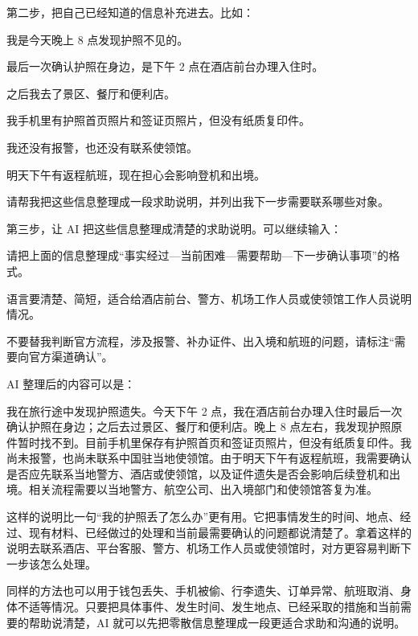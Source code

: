 第二步，把自己已经知道的信息补充进去。比如：

\begin{tcolorbox}[promptbox]
我是今天晚上 8 点发现护照不见的。

最后一次确认护照在身边，是下午 2 点在酒店前台办理入住时。

之后我去了景区、餐厅和便利店。

我手机里有护照首页照片和签证页照片，但没有纸质复印件。

我还没有报警，也还没有联系使领馆。

明天下午有返程航班，现在担心会影响登机和出境。

请帮我把这些信息整理成一段求助说明，并列出我下一步需要联系哪些对象。
\end{tcolorbox}

第三步，让 AI 把这些信息整理成清楚的求助说明。可以继续输入：

\begin{tcolorbox}[promptbox]
请把上面的信息整理成“事实经过—当前困难—需要帮助—下一步确认事项”的格式。

语言要清楚、简短，适合给酒店前台、警方、机场工作人员或使领馆工作人员说明情况。

不要替我判断官方流程，涉及报警、补办证件、出入境和航班的问题，请标注“需要向官方渠道确认”。
\end{tcolorbox}

AI 整理后的内容可以是：

\begin{tcolorbox}[promptbox]
我在旅行途中发现护照遗失。今天下午 2 点，我在酒店前台办理入住时最后一次确认护照在身边；之后去过景区、餐厅和便利店。晚上 8 点左右，我发现护照原件暂时找不到。目前手机里保存有护照首页和签证页照片，但没有纸质复印件。我尚未报警，也尚未联系中国驻当地使领馆。由于明天下午有返程航班，我需要确认是否应先联系当地警方、酒店或使领馆，以及证件遗失是否会影响后续登机和出境。相关流程需要以当地警方、航空公司、出入境部门和使领馆答复为准。
\end{tcolorbox}

这样的说明比一句“我的护照丢了怎么办”更有用。它把事情发生的时间、地点、经过、现有材料、已经做过的处理和当前最需要确认的问题都说清楚了。拿着这样的说明去联系酒店、平台客服、警方、机场工作人员或使领馆时，对方更容易判断下一步该怎么处理。

同样的方法也可以用于钱包丢失、手机被偷、行李遗失、订单异常、航班取消、身体不适等情况。只要把具体事件、发生时间、发生地点、已经采取的措施和当前需要的帮助说清楚，AI 就可以先把零散信息整理成一段更适合求助和沟通的说明。

